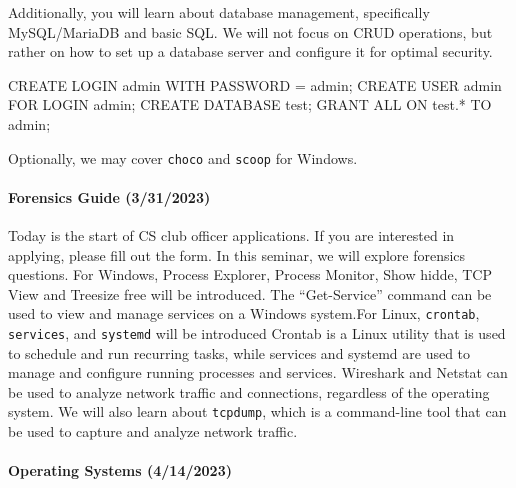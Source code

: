 \documentclass[
  letterpaper,
  DIV=11,
  numbers=noendperiod]{scrartcl}
\let\oldparagraph\paragraph
\renewcommand{\paragraph}[1]{\oldparagraph{#1}\mbox{}}
\newenvironment{Shaded}{\begin{snugshade}}{\end{snugshade}}
\newcommand{\ControlFlowTok}[1]{\textcolor[rgb]{0.00,0.23,0.31}{#1}}
\newcommand{\FunctionTok}[1]{\textcolor[rgb]{0.28,0.35,0.67}{#1}}
\newcommand{\KeywordTok}[1]{\textcolor[rgb]{0.00,0.23,0.31}{#1}}
\newcommand{\NormalTok}[1]{\textcolor[rgb]{0.00,0.23,0.31}{#1}}
\newcommand{\OperatorTok}[1]{\textcolor[rgb]{0.37,0.37,0.37}{#1}}
\newcommand{\StringTok}[1]{\textcolor[rgb]{0.13,0.47,0.30}{#1}}
\begin{document}
Additionally, you will learn about database management, specifically
MySQL/MariaDB and basic SQL. We will not focus on CRUD operations, but
rather on how to set up a database server and configure it for optimal
security.

\begin{Shaded}
\begin{Highlighting}[]
\KeywordTok{CREATE}\NormalTok{ LOGIN }\KeywordTok{admin} \KeywordTok{WITH} \KeywordTok{PASSWORD} \OperatorTok{=} \StringTok{\textquotesingle{}admin\textquotesingle{}}\NormalTok{;}
\KeywordTok{CREATE} \FunctionTok{USER} \KeywordTok{admin} \ControlFlowTok{FOR}\NormalTok{ LOGIN }\KeywordTok{admin}\NormalTok{;}
\KeywordTok{CREATE} \KeywordTok{DATABASE}\NormalTok{ test;}
\KeywordTok{GRANT} \KeywordTok{ALL} \KeywordTok{ON}\NormalTok{ test.}\OperatorTok{*} \KeywordTok{TO} \KeywordTok{admin}\NormalTok{;}
\end{Highlighting}
\end{Shaded}

Optionally, we may cover \texttt{choco} and \texttt{scoop} for Windows.

\hypertarget{forensics-guide-3312023}{%
\paragraph{Forensics Guide (3/31/2023)}\label{forensics-guide-3312023}}

Today is the start of CS club officer applications. If you are
interested in applying, please fill out the form. In this seminar, we
will explore forensics questions. For Windows, Process Explorer, Process
Monitor, Show hidde, TCP View and Treesize free will be introduced. The
``Get-Service'' command can be used to view and manage services on a
Windows system.For Linux, \texttt{crontab}, \texttt{services}, and
\texttt{systemd} will be introduced Crontab is a Linux utility that is
used to schedule and run recurring tasks, while services and systemd are
used to manage and configure running processes and services. Wireshark
and Netstat can be used to analyze network traffic and connections,
regardless of the operating system. We will also learn about
\texttt{tcpdump}, which is a command-line tool that can be used to
capture and analyze network traffic.

\hypertarget{operating-systems-4142023}{%
\paragraph{Operating Systems
(4/14/2023)}\label{operating-systems-4142023}}
\end{document}
